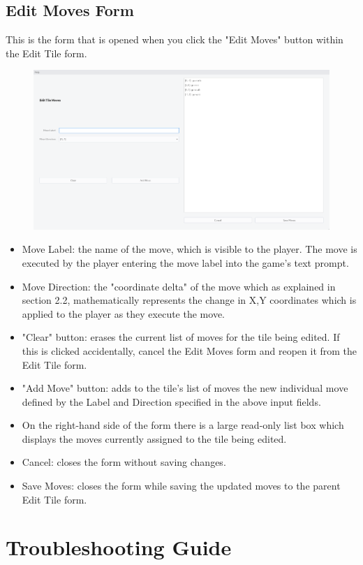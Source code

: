 \documentclass{article} \usepackage[margin=1in,headheight=57pt,headsep=0.1in]{geometry}
\begin{document}
\subsection{Edit Moves Form}
This is the form that is opened when you click the "Edit Moves" button within the Edit Tile form.
\begin{figure}[H]
	\centering
	\includegraphics[width=1.0\textwidth]{./editMovesForm.png}
\end{figure}
\begin{itemize}
	\item Move Label: the name of the move, which is visible to the player. The move is executed by the player entering the move label into the game's text prompt.
	\item Move Direction: the "coordinate delta" of the move which as explained in section 2.2, mathematically represents the change in X,Y coordinates which is applied to the player as they execute the move.
	\item "Clear" button: erases the current list of moves for the tile being edited. If this is clicked accidentally, cancel the Edit Moves form and reopen it from the Edit Tile form.
	\item "Add Move" button: adds to the tile's list of moves the new individual move defined by the Label and Direction specified in the above input fields.
	\item On the right-hand side of the form there is a large read-only list box which displays the moves currently assigned to the tile being edited.
	\item Cancel: closes the form without saving changes.
	\item Save Moves: closes the form while saving the updated moves to the parent Edit Tile form.
\end{itemize}
\newpage
\section{Troubleshooting Guide}
\end{document}
